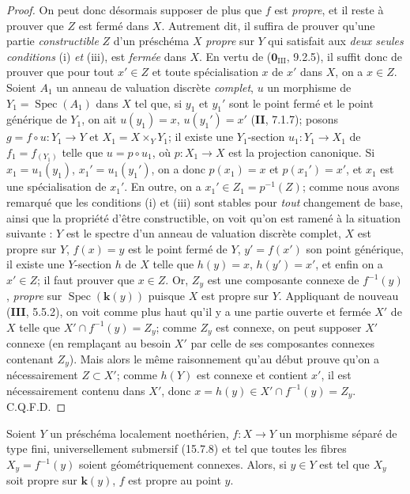 \begin{proof}
On peut donc désormais supposer de plus que $f$ est \emph{propre}, et il reste à prouver que $Z$ est fermé dans $X$. Autrement dit, il suffira de prouver qu'une partie \emph{constructible} $Z$ d'un préschéma $X$ \emph{propre} sur $Y$ qui satisfait aux \emph{deux seules conditions} (i) \emph{et} (iii), est \emph{fermée} dans $X$. En vertu de ($\mathbf{0}_{\mathrm{III}}$, 9.2.5), il suffit donc de prouver que pour tout $x'\in Z$ et toute spécialisation $x$ de $x'$ dans $X$, on a $x\in Z$. Soient $A_1$ un anneau de valuation discrète \emph{complet}, $u$ un morphisme de $Y_1=\operatorname{Spec}(A_1)$ dans $X$ tel que, si $y_1$ et $y_1'$ sont le point fermé et le point générique de $Y_1$, on ait $u(y_1)=x$, $u(y_1')=x'$ (\textbf{II}, 7.1.7); posons $g=f\circ u:Y_1\to Y$ et $X_1=X\times_Y Y_1$; il existe une $Y_1$-section $u_1:Y_1\to X_1$ de $f_1=f_{(Y_1)}$ telle que $u=p\circ u_1$, où $p:X_1\to X$ est la projection canonique. Si $x_1=u_1(y_1)$, $x_1'=u_1(y_1')$, on a donc $p(x_1)=x$ et $p(x_1')=x'$, et $x_1$ est une spécialisation de $x_1'$. En outre, on a $x_1'\in Z_1=p^{-1}(Z)$; comme nous avons remarqué que les conditions (i) et (iii) sont stables pour \emph{tout} changement de base, ainsi que la propriété d'être constructible, on voit qu'on est ramené à la situation suivante : $Y$ est le spectre d'un anneau de valuation discrète complet, $X$ est propre sur $Y$, $f(x)=y$ est le point fermé de $Y$, $y'=f(x')$ son point générique, il existe une $Y$-section $h$ de $X$ telle que $h(y)=x$, $h(y')=x'$, et enfin on a $x'\in Z$; il faut prouver que $x\in Z$. Or, $Z_y$ est une composante connexe de $f^{-1}(y)$, \emph{propre} sur $\operatorname{Spec}(\boldsymbol{k}(y))$ puisque $X$ est propre sur $Y$. Appliquant de nouveau (\textbf{III}, 5.5.2), on voit comme plus haut qu'il y a une partie ouverte et fermée $X'$ de $X$ telle que $X'\cap f^{-1}(y)=Z_y$; comme $Z_y$ est connexe,
on peut supposer $X'$ connexe (en remplaçant au besoin $X'$ par celle de ses composantes connexes contenant $Z_y$). Mais alors le même raisonnement qu'au début prouve qu'on a nécessairement $Z\subset X'$; comme $h(Y)$ est connexe et contient $x'$, il est nécessairement contenu dans $X'$, donc $x=h(y)\in X'\cap f^{-1}(y)=Z_y$. C.Q.F.D.
\end{proof}

\begin{corollary}[15.7.10]
\label{IV.15.7.10-fr}
Soient $Y$ un préschéma localement noethérien, $f:X\to Y$ un morphisme séparé de type fini, universellement submersif \textup{(15.7.8)} et tel que toutes les fibres $X_y=f^{-1}(y)$ soient géométriquement connexes. Alors, si $y\in Y$ est tel que $X_y$ soit propre sur $\boldsymbol{k}(y)$, $f$ est propre au point $y$.
\end{corollary}

